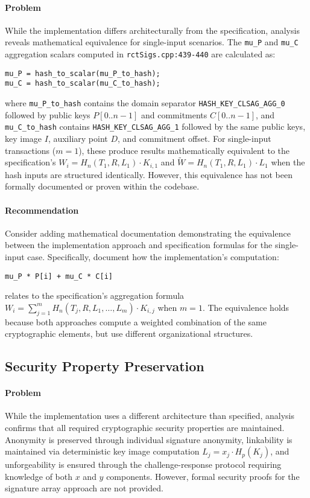 \documentclass{article}
\begin{document}
\paragraph{Problem}
While the implementation differs architecturally from the specification, 
analysis reveals mathematical equivalence for single-input scenarios.  
The \texttt{mu\_P} and \texttt{mu\_C} aggregation scalars computed in 
\texttt{rctSigs.cpp:439-440} are calculated as:
\begin{verbatim}
mu_P = hash_to_scalar(mu_P_to_hash);
mu_C = hash_to_scalar(mu_C_to_hash);
\end{verbatim}
where \texttt{mu\_P\_to\_hash} contains the domain separator \texttt{HASH\_KEY\_CLSAG\_AGG\_0} 
followed by public keys $P[0..n-1]$ and commitments $C[0..n-1]$, and \texttt{mu\_C\_to\_hash} 
contains \texttt{HASH\_KEY\_CLSAG\_AGG\_1} followed by the same public keys, key image $I$, 
auxiliary point $D$, and commitment offset.  For single-input transactions ($m=1$), 
these produce results mathematically equivalent to the specification's 
$W_i = H_n(T_1, R, L_1) \cdot K_{i,1}$ and $\tilde{W} = H_n(T_1, R, L_1) \cdot L_1$ 
when the hash inputs are structured identically. However, this equivalence has not 
been formally documented or proven within the codebase.

\paragraph{Recommendation}
Consider adding mathematical documentation demonstrating the equivalence 
between the implementation approach and specification formulas for the 
single-input case.  Specifically, document how the implementation's computation:
\begin{verbatim}
mu_P * P[i] + mu_C * C[i]
\end{verbatim}
relates to the specification's aggregation formula \\$W_i = \sum_{j=1}^{m} H_n(T_j, R, L_1, \ldots, L_m) \cdot K_{i,j}$ 
when $m=1$.  The equivalence holds because both approaches compute a weighted combination 
of the same cryptographic elements, but use different organizational structures.

\subsection{Security Property Preservation}
\paragraph{Problem}
While the implementation uses a different architecture than specified, 
analysis confirms that all required cryptographic security properties are 
maintained.  Anonymity is preserved through individual signature anonymity, 
linkability is maintained via deterministic key image computation 
$L_j = x_j \cdot H_p(K_j)$, and unforgeability is ensured through the 
challenge-response protocol requiring knowledge of both $x$ and $y$ 
components.  However, formal security proofs for the signature array 
approach are not provided.
\end{document}

